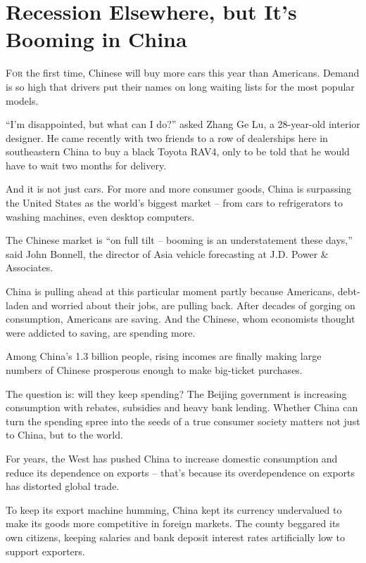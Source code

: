 ﻿\documentclass[12pt]{article}
\begin{document}
\section{Recession Elsewhere, but It's Booming in China }

\lettrine{F}{or} the first time, Chinese will buy more cars this year than
Americans. Demand is so high that drivers put their names on long waiting lists for the most popular
models.

``I'm disappointed, but what can I do?'' asked Zhang Ge Lu, a 28-year-old interior designer. He came
recently with two friends to a row of dealerships here in southeastern China to buy a black Toyota
RAV4, only to be told that he would have to wait two months for delivery.

And it is not just cars. For more and more consumer goods, China is surpassing the United States as
the world's biggest market -- from cars to refrigerators to washing machines, even desktop
computers.

The Chinese market is ``on full tilt -- booming is an understatement these days,'' said John
Bonnell, the director of Asia vehicle forecasting at J.D. Power \& Associates.

China is pulling ahead at this particular moment partly because Americans, debt-laden and worried
about their jobs, are pulling back. After decades of gorging on consumption, Americans are saving.
And the Chinese, whom economists thought were addicted to saving, are spending more.

Among China's 1.3 billion people, rising incomes are finally making large numbers of Chinese
prosperous enough to make big-ticket purchases.

The question is: will they keep spending? The Beijing government is increasing consumption with
rebates, subsidies and heavy bank lending. Whether China can turn the spending spree into the seeds
of a true consumer society matters not just to China, but to the world.

For years, the West has pushed China to increase domestic consumption and reduce its dependence on
exports -- that's because its overdependence on exports has distorted global trade.

To keep its export machine humming, China kept its currency undervalued to make its goods more
competitive in foreign markets. The county beggared its own citizens, keeping salaries and bank
deposit interest rates artificially low to support exporters.
\end{document}
